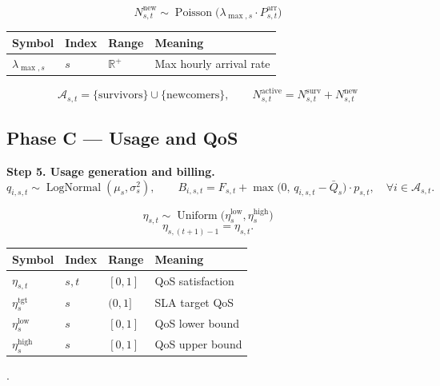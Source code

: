 \documentclass[11pt]{article}
\begin{document}
\begin{equation}
N_{s,t}^{\mathrm{new}} \sim \operatorname{Poisson}\bigl(\lambda_{\max,s} \cdot P_{s,t}^{\mathrm{arr}}\bigr)
\tag{F5}
\end{equation}

\begin{longtable}{@{}llll@{}}
\toprule
Symbol & Index & Range & Meaning \\
\midrule
\endhead
$\lambda_{\max,s}$ & $s$ & $\mathbb{R}^{+}$ & Max hourly arrival rate \\
\bottomrule
\end{longtable}

\begin{equation}
\mathcal{A}_{s,t} = \{\text{survivors}\} \cup \{\text{newcomers}\},
\qquad
N_{s,t}^{\mathrm{active}} = N_{s,t}^{\mathrm{surv}} + N_{s,t}^{\mathrm{new}}
\tag{F6}
\end{equation}

\subsection*{Phase C --- Usage and QoS}
\textbf{Step 5. Usage generation and billing.}
\begin{equation*}
q_{i,s,t} \sim \operatorname{LogNormal}(\mu_s,\sigma_s^2),
\qquad
B_{i,s,t} = F_{s,t} + \max\bigl(0,\, q_{i,s,t} - \bar{Q}_s\bigr) \cdot p_{s,t},
\quad \forall i \in \mathcal{A}_{s,t}.
\end{equation*}

\textbf{{\color{blue}{Step 6. QoS realization.}}}
\begin{equation}
\eta_{s,t} \sim \operatorname{Uniform}\bigl(\eta_s^{\mathrm{low}},\eta_s^{\mathrm{high}}\bigr)
\tag{F7}
\end{equation}
\begin{equation*}
\eta_{s,(t+1)-1} = \eta_{s,t}.
\end{equation*}

\begin{longtable}{@{}llll@{}}
\toprule
Symbol & Index & Range & Meaning \\
\midrule
\endhead
$\eta_{s,t}$ & $s,t$ & $[0,1]$ & QoS satisfaction \\
$\eta_s^{\mathrm{tgt}}$ & $s$ & $(0,1]$ & SLA target QoS \\
$\eta_s^{\mathrm{low}}$ & $s$ & $[0,1]$ & QoS lower bound \\
$\eta_s^{\mathrm{high}}$ & $s$ & $[0,1]$ & QoS upper bound \\
\bottomrule
\end{longtable}
{}.
\end{document}
